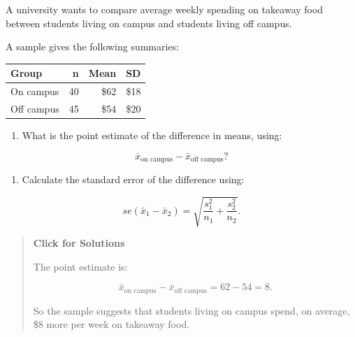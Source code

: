 \documentclass[
  letterpaper,
  DIV=11,
  numbers=noendperiod]{scrreprt}
\providecommand{\tightlist}{%
  \setlength{\itemsep}{0pt}\setlength{\parskip}{0pt}}
\begin{document}
\begin{tcolorbox}[enhanced jigsaw, arc=.35mm, bottomrule=.15mm, bottomtitle=1mm, breakable, colback=white, colbacktitle=quarto-callout-note-color!10!white, colframe=quarto-callout-note-color-frame, coltitle=black, left=2mm, leftrule=.75mm, opacityback=0, opacitybacktitle=0.6, rightrule=.15mm, title=\textcolor{quarto-callout-note-color}{\faInfo}\hspace{0.5em}{Question 7}, titlerule=0mm, toprule=.15mm, toptitle=1mm]

A university wants to compare average weekly spending on takeaway food
between students living on campus and students living off campus.

A sample gives the following summaries:

\begin{table}
\fontsize{12.0pt}{14.0pt}\selectfont
\begin{tabular*}{\linewidth}{@{\extracolsep{\fill}}lrrr}
\toprule
Group & n & Mean & SD \\ 
\midrule\addlinespace[2.5pt]
On campus & 40 & \$62 & \$18 \\ 
Off campus & 45 & \$54 & \$20 \\ 
\bottomrule
\end{tabular*}
\end{table}

\begin{enumerate}
\def\labelenumi{\arabic{enumi}.}
\tightlist
\item
  What is the point estimate of the difference in means, using:
\end{enumerate}

\[
\bar{x}_{\text{on campus}} - \bar{x}_{\text{off campus}}?
\]

\begin{enumerate}
\def\labelenumi{\arabic{enumi}.}
\setcounter{enumi}{1}
\tightlist
\item
  Calculate the standard error of the difference using:
\end{enumerate}

\[
se(\bar{x}_1 - \bar{x}_2)
=
\sqrt{
\frac{s_1^2}{n_1}
+
\frac{s_2^2}{n_2}
}.
\]

\begin{quote}
\textbf{Click for Solutions}

The point estimate is:

\[
\bar{x}_{\text{on campus}} - \bar{x}_{\text{off campus}}
=
62 - 54
=
8.
\]

So the sample suggests that students living on campus spend, on average,
\$8 more per week on takeaway food.


\end{quote}
\end{tcolorbox}
\end{document}
